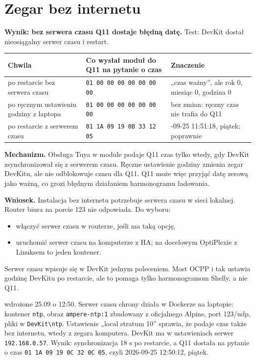 \documentclass[11pt,a4paper]{article}
\begin{document}
\section{Zegar bez internetu}

\textbf{Wynik: bez serwera czasu Q11 dostaje błędną datę.} Test: DevKit dostał nieosiągalny serwer czasu i restart.


\begin{longtable}{>{\raggedright\arraybackslash}p{4.53cm}>{\raggedright\arraybackslash}p{5.01cm}>{\raggedright\arraybackslash}p{5.75cm}}
\toprule
\rowcolor{apteallight}\textbf{Chwila} & \textbf{Co wysłał moduł do Q11 na pytanie o czas} & \textbf{Znaczenie} \\
\midrule\endhead
\bottomrule\endfoot
po restarcie bez serwera czasu & \texttt{01 00 00 00 00 00 00 00} & „czas ważny”, ale rok 0, miesiąc 0, godzina 0 \\
po ręcznym ustawieniu godziny z laptopa & \texttt{01 00 00 00 00 00 00 00} & bez zmian: ręczny czas nie trafia do Q11 \\
po restarcie z serwerem czasu & \texttt{01 1A 09 19 0B 33 12 05} & 2026-09-25 11:51:18, piątek; poprawnie \\
\end{longtable}

\textbf{Mechanizm.} Obsługa Tuya w module podaje Q11 czas tylko wtedy, gdy DevKit zsynchronizował się z serwerem czasu. Ręczne ustawienie godziny zmienia zegar DevKitu, ale nie odblokowuje czasu dla Q11. Q11 może więc przyjąć datę zerową jako ważną, co grozi błędnym działaniem harmonogramu ładowania.


\textbf{Wniosek.} Instalacja bez internetu potrzebuje serwera czasu w sieci lokalnej. Router biura na porcie 123 nie odpowiada. Do wyboru:

\begin{itemize}
\item włączyć serwer czasu w routerze, jeśli ma taką opcję,
\item uruchomić serwer czasu na komputerze z HA; na docelowym OptiPlexie z Linuksem to jeden kontener.
\end{itemize}

Serwer czasu wpisuje się w DevKit jednym poleceniem. Most OCPP i tak ustawia godzinę DevKitu po restarcie, ale to pomaga tylko harmonogramom Shelly, a nie Q11.


\begin{wazne}[{Ważne}]
wdrożone 25.09 o 12:50. Serwer czasu chrony działa w Dockerze na laptopie: kontener \texttt{ntp}, obraz \texttt{ampere-ntp:1} zbudowany z oficjalnego Alpine, port 123/udp, pliki w \texttt{DevKit\textbackslash{}ntp}. Ustawienie „local stratum 10” sprawia, że podaje czas także bez internetu, wtedy z zegara komputera. DevKit ma w ustawieniach serwer \texttt{192.168.0.57}. Wynik: synchronizacja 18 s po restarcie, a Q11 dostała na pytanie o czas \texttt{01 1A 09 19 0C 32 0C 05}, czyli 2026-09-25 12:50:12, piątek.
\end{wazne}
\end{document}
